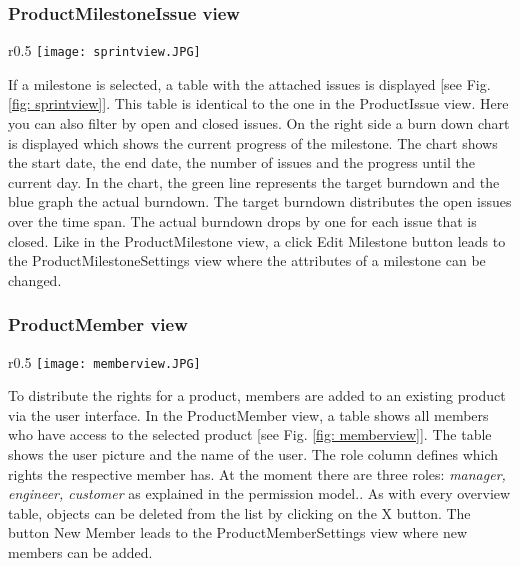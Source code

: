 \subsubsection{ProductMilestoneIssue view}

\begin{wrapfigure}{r}{0.5\textwidth}
    \centering
    \texttt{[image: sprintview.JPG]}
    \caption{ProductMilestoneIssue view}
    \label{fig: sprintview}
\end{wrapfigure}

If a milestone is selected, a table with the attached issues is displayed [see Fig. \ref{fig: sprintview}]. This table is identical to the one in the ProductIssue view. Here you can also filter by open and closed issues. On the right side a burn down chart is displayed which shows the current progress of the milestone. The chart shows the start date, the end date, the number of issues and the progress until the current day. In the chart, the green line represents the target burndown and the blue graph the actual burndown. The target burndown distributes the open issues over the time span. The actual burndown drops by one for each issue that is closed.  Like in the ProductMilestone view, a click Edit Milestone button leads to the ProductMilestoneSettings view where the attributes of a milestone can be changed.

\subsubsection{ProductMember view}

\begin{wrapfigure}{r}{0.5\textwidth}
    \centering
    \texttt{[image: memberview.JPG]}
    \caption{Member view}
    \label{fig: memberview}
\end{wrapfigure}

To distribute the rights for a product, members are added to an existing product via the user interface. In the ProductMember view, a table shows all members who have access to the selected product [see Fig. \ref{fig: memberview}]. The table shows the user picture and the name of the user. The role column defines which rights the respective member has. At the moment there are three roles: \textit{manager, engineer, customer} as explained in the permission model.. As with every overview table, objects can be deleted from the list by clicking on the X button. The button New Member leads to the ProductMemberSettings view where new members can be added.